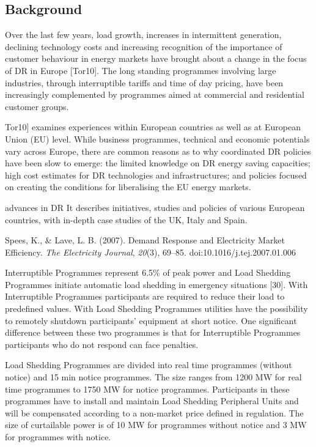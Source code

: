 
\subsection{Background}

Over the last few years, load growth, increases in intermittent generation,
declining technology costs and increasing recognition of the importance of
customer behaviour in energy markets have brought about a change in the
focus of DR in Europe [Tor10]. The long standing programmes involving large
industries, through interruptible tariffs and time of day pricing, have been
increasingly complemented by programmes aimed at commercial and residential
customer groups.

\cite{torriti_demand_2010} Tor10] examines experiences within European countries as well as at
European Union (EU) level. While business programmes, technical and economic
potentials vary across Europe, there are common reasons as to why
coordinated DR policies have been slow to emerge: the limited knowledge on
DR energy saving capacities; high cost estimates for DR technologies and
infrastructures; and policies focused on creating the conditions for
liberalising the EU energy markets.


advances in DR It describes initiatives, studies and policies of various
European countries, with in-depth case studies of the UK, Italy and Spain.

Spees, K., {\&} Lave, L. B. (2007). Demand Response and Electricity Market
Efficiency. \textit{The Electricity Journal}, \textit{20}(3), 69--85. doi:10.1016/j.tej.2007.01.006

Interruptible Programmes represent 6.5{\%} of peak power and Load Shedding
Programmes initiate automatic load shedding in emergency situations [30].
With Interruptible Programmes participants are required to reduce their load
to predefined values. With Load Shedding Programmes utilities have the
possibility to remotely shutdown participants' equipment at short notice.
One significant difference between these two programmes is that for
Interruptible Programmes participants who do not respond can face penalties.


Load Shedding Programmes are divided into real time programmes (without
notice) and 15 min notice programmes. The size ranges from 1200 MW for real
time programmes to 1750 MW for notice programmes. Participants in these
programmes have to install and maintain Load Shedding Peripheral Units and
will be compensated according to a non-market price defined in regulation.
The size of curtailable power is of 10 MW for programmes without notice and
3 MW for programmes with notice.

